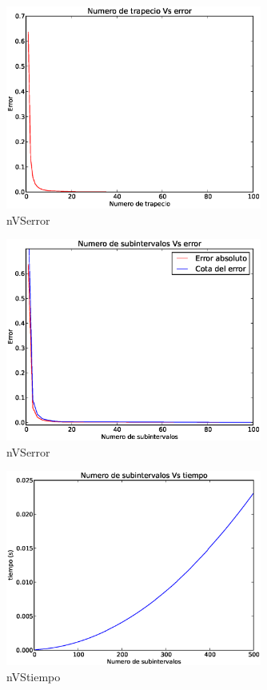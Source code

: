 \begin{figure}[h]
  \begin{center}
    \includegraphics[width=0.75\textwidth]{img/Plot_nVSerror.eps}
    \caption{nVSerror}
    \label{fig:1}
  \end{center}
\end{figure}

\begin{figure}[h]
  \begin{center}
    \includegraphics[width=0.75\textwidth]{img/Plot_nVSerrorAndcota.eps}
    \caption{nVSerror}
    \label{fig:2}
  \end{center}
\end{figure}
\begin{figure}[h]
  \begin{center}
    \includegraphics[width=0.75\textwidth]{img/Plot_nVStime.eps}
    \caption{nVStiempo}
    \label{fig:3}
  \end{center}
\end{figure}
